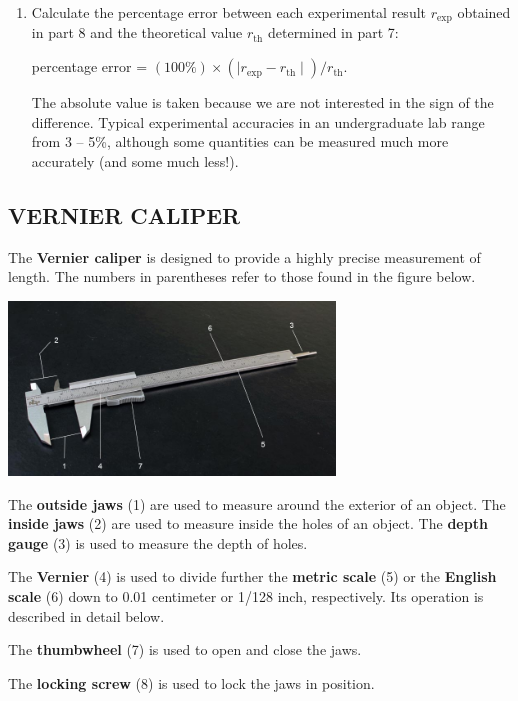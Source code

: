 \begin{enumerate}[start=6]
\item Calculate the percentage error between each experimental result \(r_{\textrm{exp}}\) obtained in part 8 and the theoretical value \(r_{\textrm{th}}\) determined in part 7:

percentage error = \( (100\%) \times \left(\mid r_{\textrm{exp}} - r_{\textrm{th}} \mid\right) / r_{\textrm{th}} . \)

The absolute value is taken because we are not interested in the sign of the difference.  Typical experimental accuracies in an undergraduate lab range from 3 -- 5\%, although some quantities can be measured much more accurately (and some much less!).

\end{enumerate}

\subsection*{VERNIER CALIPER}

The \textbf{Vernier caliper} is designed to provide a highly precise measurement of length.  The numbers in parentheses refer to those found in the figure below.
\begin{center} \includegraphics*[width=0.65\textwidth]{imgs/6labs/6Alab/6Aexp2/6A-EXP2-fig7_webtext.jpg} \end{center}

The \textbf{outside jaws} (1) are used to measure around the exterior of an object.  The \textbf{inside jaws} (2) are used to measure inside the holes of an object.  The \textbf{depth gauge} (3) is used to measure the depth of holes.

The \textbf{Vernier} (4) is used to divide further the \textbf{metric scale} (5) or the \textbf{English scale} (6) down to 0.01 centimeter or 1/128 inch, respectively.  Its operation is described in detail below.

The \textbf{thumbwheel} (7) is used to open and close the jaws.

The \textbf{locking screw} (8) is used to lock the jaws in position.

